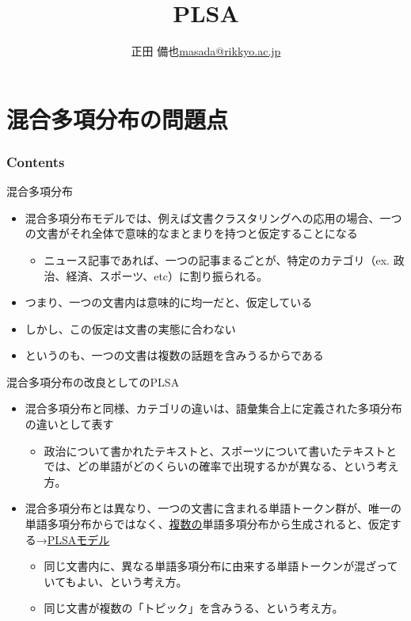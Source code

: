 \documentclass[aspectratio=169,unicode,dvipdfmx,14pt]{beamer}
\title{PLSA}
\author{\texorpdfstring{正田 備也\newline\href{mailto:masada@rikkyo.ac.jp}{masada@rikkyo.ac.jp}}{正田 備也}}
\date{}
\begin{document}
\begin{frame}
\titlepage
\end{frame}

\section{混合多項分布の問題点}

\begin{frame}\frametitle{Contents}
\Large \tableofcontents[currentsection]
\end{frame}

\begin{frame}{混合多項分布}
\begin{itemize}
\item 混合多項分布モデルでは、例えば文書クラスタリングへの応用の場合、一つの文書がそれ全体で意味的なまとまりを持つと仮定することになる
\begin{itemize}
\item ニュース記事であれば、一つの記事まるごとが、特定のカテゴリ（ex. 政治、経済、スポーツ、etc）に割り振られる。
\end{itemize}
\item つまり、一つの文書内は意味的に均一だと、仮定している
\item しかし、この仮定は文書の実態に合わない
\item というのも、一つの文書は複数の話題を含みうるからである
\end{itemize}
\end{frame}

\begin{frame}{混合多項分布の改良としてのPLSA}
\begin{itemize}
\item 混合多項分布と同様、カテゴリの違いは、語彙集合上に定義された多項分布の違いとして表す
\begin{itemize}
\item 政治について書かれたテキストと、スポーツについて書いたテキストとでは、どの単語がどのくらいの確率で出現するかが異なる、という考え方。
\end{itemize}
\item 混合多項分布とは異なり、一つの文書に含まれる単語トークン群が、唯一の単語多項分布からではなく、\underline{複数の}単語多項分布から生成されると、仮定する→\underline{PLSAモデル}
\begin{itemize}
\item 同じ文書内に、異なる単語多項分布に由来する単語トークンが混ざっていてもよい、という考え方。
\item 同じ文書が複数の「トピック」を含みうる、という考え方。
\end{itemize}
\end{itemize}
\end{frame}
\end{document}
